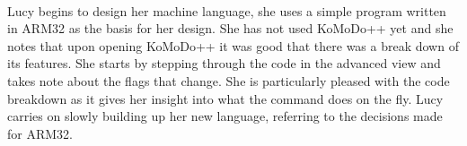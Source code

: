 %
\\
Lucy begins to design her machine language, she uses a simple program written in ARM32 as the basis for her design. She has not used KoMoDo++ yet and she notes that upon opening KoMoDo++ it was good that there was a break down of its features. She starts by stepping through the code in the advanced view and takes note about the flags that change. She is particularly pleased with the code breakdown as it gives her insight into what the command does on the fly. Lucy carries on slowly building up her new language, referring to the decisions made for ARM32.
